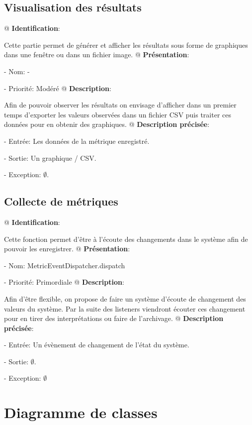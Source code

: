 \documentclass[noposter,final]{polytech/polytech}
\begin{document}
	\section{Visualisation des résultats}
		\begin{easylist}[enumerate]
			@ \textbf{Identification}:
			
			Cette partie permet de générer et afficher les résultats sous forme de graphiques dans une fenêtre ou dans un fichier image.
			@ \textbf{Présentation}:
			
			- Nom: -
			
			- Priorité: Modéré
			@ \textbf{Description}:
			
			Afin de pouvoir observer les résultats on envisage d'afficher dans un premier temps d'exporter les valeurs observées dans un fichier CSV puis traiter ces données pour en obtenir des graphiques.
			@ \textbf{Description précisée}:
			
			- Entrée: Les données de la métrique enregistré.
			
			- Sortie: Un graphique / CSV.
			
			- Exception: $\emptyset$.
		\end{easylist}
		
	\section{Collecte de métriques}
		\begin{easylist}[enumerate]
			@ \textbf{Identification}:
			
			Cette fonction permet d'être à l'écoute des changements dans le système afin de pouvoir les enregistrer.
			@ \textbf{Présentation}:
			
			- Nom: MetricEventDispatcher.dispatch
			
			- Priorité: Primordiale
			@ \textbf{Description}:
			
			Afin d'être flexible, on propose de faire un système d'écoute de changement des valeurs du système.
			Par la suite des listeners viendront écouter ces changement pour en tirer des interprétations ou faire de l'archivage.
			@ \textbf{Description précisée}:
			
			- Entrée: Un évènement de changement de l'état du système.
			
			- Sortie: $\emptyset$.
			
			- Exception: $\emptyset$
		\end{easylist}
	
\chapter{Diagramme de classes}
	\vspace{-50pt}
			
\end{document}
